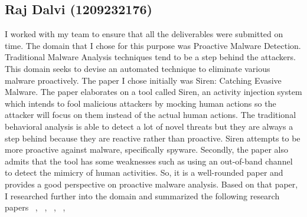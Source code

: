 \documentclass[11pt]{article}
\begin{document}
\subsection{Raj Dalvi (1209232176)}
I worked with my team to ensure that all the deliverables were submitted on time. The domain that I chose for this purpose was Proactive Malware Detection. Traditional Malware Analysis techniques tend to be a step behind the attackers. This domain seeks to devise an automated technique to eliminate various malware proactively. The paper I chose initially was Siren: Catching Evasive Malware. The paper elaborates on a tool called Siren, an activity injection system which intends to fool malicious attackers
by mocking human actions so the attacker will focus on them instead of the actual human actions. The traditional behavioral analysis is able to detect a lot of novel threats but they are always a step behind because they are reactive rather than proactive. Siren attempts to be more proactive against malware, specifically spyware. Secondly, the paper also admits that the tool has some weaknesses such as using an out-of-band channel to detect the mimicry of human activities. So, it is a well-rounded paper and provides a good perspective on proactive malware analysis. Based on that paper, I researched further into the domain and summarized the following research papers ~\cite{cyberthreatanalysis}, ~\cite{hookscout}, ~\cite{behaviorbasedproactive}, ~\cite{softcomputingproactive}, ~\cite{nidsproactive}
	
\end{document}
